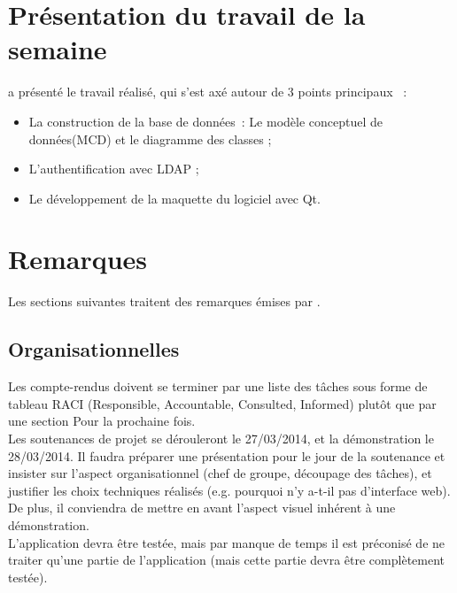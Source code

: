 \documentclass[11pt,fleqn]{report}
\begin{document}
\section{Présentation du travail de la semaine}

\amo a présenté le travail réalisé, qui s'est axé autour de 3 points principaux ~:
\begin{itemize}
      \item  La construction de la base de données~: Le modèle conceptuel de données(MCD) et le diagramme des classes ;
      \item L'authentification avec LDAP ;
      \item Le développement  de la maquette du logiciel avec Qt.
      \end{itemize} 


\section{Remarques}

Les sections suivantes traitent des remarques émises par \mo.

\subsection{Organisationnelles}

Les compte-rendus doivent se terminer par une liste des tâches sous forme de tableau RACI (Responsible, Accountable, Consulted, Informed) plutôt que par une section \og{}Pour la prochaine fois\fg{}.\\
Les soutenances de projet se dérouleront le 27/03/2014, et la démonstration le 28/03/2014. Il faudra préparer une présentation pour le jour de la soutenance et insister sur l'aspect organisationnel (chef de groupe, découpage des tâches), et justifier les choix techniques réalisés (e.g. pourquoi n'y a-t-il pas d'interface web). De plus, il conviendra de mettre en avant l'aspect visuel inhérent à une démonstration.\\
L'application devra être testée, mais par manque de temps il est préconisé de ne traiter qu'une partie de l'application (mais cette partie devra être complètement testée).
\end{document}
